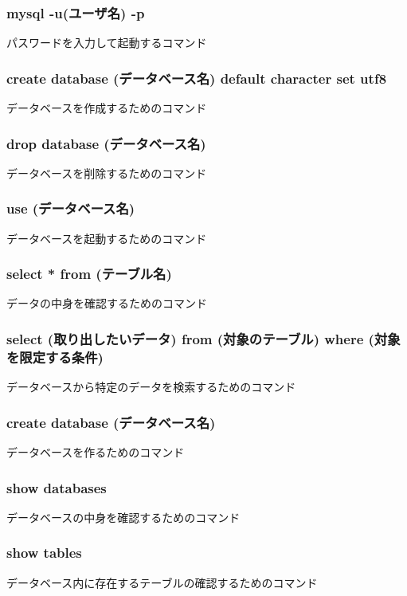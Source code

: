 \subsubsection{mysql -u(ユーザ名) -p}
パスワードを入力して起動するコマンド

\subsubsection{create database (データベース名) default character set utf8}
データベースを作成するためのコマンド

\subsubsection{drop database (データベース名)}
データベースを削除するためのコマンド

\subsubsection{use (データベース名)}
データベースを起動するためのコマンド

\subsubsection{select * from (テーブル名)}
データの中身を確認するためのコマンド

\subsubsection{select (取り出したいデータ) from (対象のテーブル) where (対象を限定する条件)}
データベースから特定のデータを検索するためのコマンド

\subsubsection{create database (データベース名)}
データベースを作るためのコマンド

\subsubsection{show databases}
データベースの中身を確認するためのコマンド

\subsubsection{show tables}
データベース内に存在するテーブルの確認するためのコマンド



